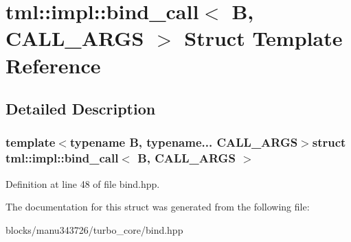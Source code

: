 \hypertarget{structtml_1_1impl_1_1bind__call}{\section{tml\+:\+:impl\+:\+:bind\+\_\+call$<$ B, C\+A\+L\+L\+\_\+\+A\+R\+G\+S $>$ Struct Template Reference}
\label{structtml_1_1impl_1_1bind__call}
}


\subsection{Detailed Description}
\subsubsection*{template$<$typename B, typename... C\+A\+L\+L\+\_\+\+A\+R\+G\+S$>$struct tml\+::impl\+::bind\+\_\+call$<$ B, C\+A\+L\+L\+\_\+\+A\+R\+G\+S $>$}



Definition at line 48 of file bind.\+hpp.



The documentation for this struct was generated from the following file\+:\begin{DoxyCompactItemize}
\item 
blocks/manu343726/turbo\+\_\+core/bind.\+hpp\end{DoxyCompactItemize}
